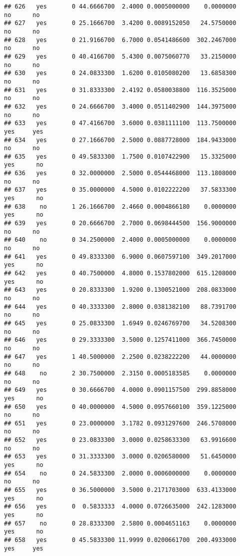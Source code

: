 \documentclass[]{article}
\begin{document}
\begin{verbatim}
## 626   yes       0 44.6666700  2.4000 0.0005000000    0.0000000    no      no
## 627   yes       0 25.1666700  3.4200 0.0089152050   24.5750000    no      no
## 628   yes       0 21.9166700  6.7000 0.0541486600  302.2467000    no      no
## 629   yes       0 40.4166700  5.4300 0.0075060770   33.2150000    no      no
## 630   yes       0 24.0833300  1.6200 0.0105080200   13.6858300    no      no
## 631   yes       0 31.8333300  2.4192 0.0580038800  116.3525000    no      no
## 632   yes       0 24.6666700  3.4000 0.0511402900  144.3975000    no      no
## 633   yes       0 47.4166700  3.6000 0.0381111100  113.7500000   yes     yes
## 634   yes       0 27.1666700  2.5000 0.0887728000  184.9433000    no      no
## 635   yes       0 49.5833300  1.7500 0.0107422900   15.3325000   yes      no
## 636   yes       0 32.0000000  2.5000 0.0544468000  113.1808000    no      no
## 637   yes       0 35.0000000  4.5000 0.0102222200   37.5833300   yes      no
## 638    no       1 26.1666700  2.4660 0.0004866180    0.0000000   yes      no
## 639   yes       0 20.6666700  2.7000 0.0698444500  156.9000000    no      no
## 640    no       0 34.2500000  2.4000 0.0005000000    0.0000000    no      no
## 641   yes       0 49.8333300  6.9000 0.0607597100  349.2017000   yes      no
## 642   yes       0 40.7500000  4.8000 0.1537802000  615.1208000   yes      no
## 643   yes       0 20.8333300  1.9200 0.1300521000  208.0833000    no      no
## 644   yes       0 40.3333300  2.8000 0.0381382100   88.7391700    no      no
## 645   yes       0 25.0833300  1.6949 0.0246769700   34.5208300    no      no
## 646   yes       0 29.3333300  3.5000 0.1257411000  366.7450000    no      no
## 647   yes       1 40.5000000  2.2500 0.0238222200   44.0000000    no      no
## 648    no       2 30.7500000  2.3150 0.0005183585    0.0000000    no      no
## 649   yes       0 30.6666700  4.0000 0.0901157500  299.8858000   yes      no
## 650   yes       0 40.0000000  4.5000 0.0957660100  359.1225000    no      no
## 651   yes       0 23.0000000  3.1782 0.0931297600  246.5708000    no      no
## 652   yes       0 23.0833300  3.0000 0.0258633300   63.9916600    no      no
## 653   yes       0 31.3333300  3.0000 0.0206580000   51.6450000   yes      no
## 654    no       0 24.5833300  2.0000 0.0006000000    0.0000000    no      no
## 655   yes       0 36.5000000  3.5000 0.2171703000  633.4133000   yes      no
## 656   yes       0  0.5833333  4.0000 0.0726635000  242.1283000   yes      no
## 657    no       0 28.8333300  2.5800 0.0004651163    0.0000000   yes      no
## 658   yes       0 45.5833300 11.9999 0.0200661700  200.4933000   yes     yes

\end{verbatim}
\end{document}
